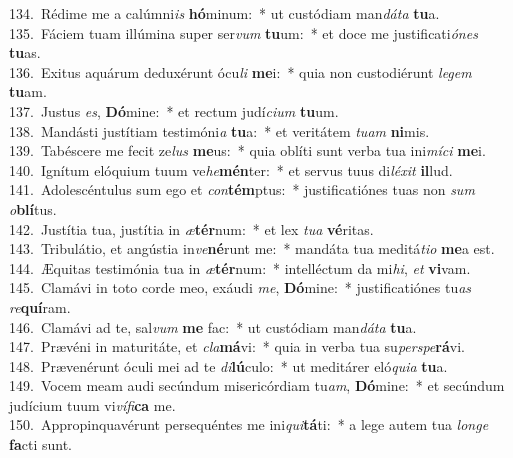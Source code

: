 {134.~}Rédime me a calúmni\textit{is} \textbf{hó}minum:~* ut custódiam man\textit{dá}\textit{ta} \textbf{tu}a.\\
{135.~}Fáciem tuam illúmina super ser\textit{vum} \textbf{tu}um:~* et doce me justificati\textit{ó}\textit{nes} \textbf{tu}as.\\
{136.~}Exitus aquárum deduxérunt ócu\textit{li} \textbf{me}i:~* quia non custodiérunt \textit{le}\textit{gem} \textbf{tu}am.\\
{137.~}Justus \textit{es}, \textbf{Dó}mine:~* et rectum judí\textit{ci}\textit{um} \textbf{tu}um.\\
{138.~}Mandásti justítiam testimóni\textit{a} \textbf{tu}a:~* et veritátem \textit{tu}\textit{am} \textbf{ni}mis.\\
{139.~}Tabéscere me fecit ze\textit{lus} \textbf{me}us:~* quia oblíti sunt verba tua ini\textit{mí}\textit{ci} \textbf{me}i.\\
{140.~}Ignítum elóquium tuum ve\textit{he}\textbf{mén}ter:~* et servus tuus di\textit{lé}\textit{xit} \textbf{il}lud.\\
{141.~}Adolescéntulus sum ego et \textit{con}\textbf{tém}ptus:~* justificatiónes tuas non \textit{sum} \textit{o}\textbf{blí}tus.\\
{142.~}Justítia tua, justítia in \textit{æ}\textbf{tér}num:~* et lex \textit{tu}\textit{a} \textbf{vé}ritas.\\
{143.~}Tribulátio, et angústia in\textit{ve}\textbf{né}runt me:~* mandáta tua meditá\textit{ti}\textit{o} \textbf{me}a est.\\
{144.~}Æquitas testimónia tua in \textit{æ}\textbf{tér}num:~* intelléctum da mi\textit{hi}, \textit{et} \textbf{vi}vam.\\
{145.~}Clamávi in toto corde meo, exáudi \textit{me}, \textbf{Dó}mine:~* justificatiónes tu\textit{as} \textit{re}\textbf{quí}ram.\\
{146.~}Clamávi ad te, sal\textit{vum} \textbf{me} fac:~* ut custódiam man\textit{dá}\textit{ta} \textbf{tu}a.\\
{147.~}Prævéni in maturitáte, et \textit{cla}\textbf{má}vi:~* quia in verba tua su\textit{per}\textit{spe}\textbf{rá}vi.\\
{148.~}Prævenérunt óculi mei ad te \textit{di}\textbf{lú}culo:~* ut meditárer eló\textit{qui}\textit{a} \textbf{tu}a.\\
{149.~}Vocem meam audi secúndum misericórdiam tu\textit{am}, \textbf{Dó}mine:~* et secúndum judícium tuum vi\textit{ví}\textit{fi}\textbf{ca} me.\\
{150.~}Appropinquavérunt persequéntes me ini\textit{qui}\textbf{tá}ti:~* a lege autem tua \textit{lon}\textit{ge} \textbf{fa}cti sunt.\\
